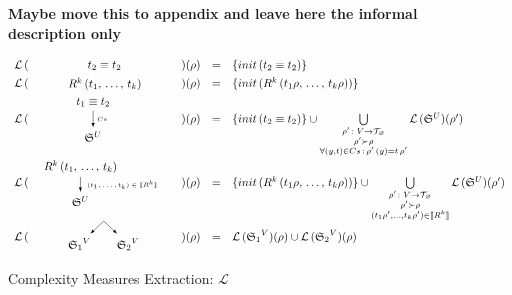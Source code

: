 \begin{figure}[t]
\colorbox{yellow!20}{\parbox{\textwidth}{\textbf{Maybe move this to appendix and leave here the informal description only}}}

\[
\begin{array}{rclcl}
 \mathcal{L}\,(&\parbox[m]{1.3cm}{\schemenode{$\unigoal{t_2}{t_2}$}}&)(\rho) &=& \{init\,(\unigoal{t_2}{t_2})\} \\

 \mathcal{L}\,(&\parbox[m]{2.5cm}{\schemenode{$\invokegoal{R^k}{t_1}{t_k}$}}&)(\rho) &=& \{init\,(\invokegoal{R^k}{t_1 \rho}{t_k \rho})\} \\

 \mathcal{L}\,(&\parbox[m]{2cm}{\schemesarrow{$\unigoal{t_1}{t_2}$}{$Cs$}{$\schemewithvset{\mathfrak{S}}{U}$}} &)(\rho) &=&  \{init\,(\unigoal{t_2}{t_2})\} \cup
      \bigcup\limits_{\substack{ \rho' \colon V \to \grterms \\
                                      \rho' \succ \rho \\
                                      \forall (y, t) \in Cs\,:\, \rho'\,(y) = t\, \rho'  }}
           \mathcal{L}\,(\schemewithvset{\mathfrak{S}}{U})(\rho')  \\

 \mathcal{L}\,(& \parbox[m]{4cm}{\schemedarrow{$\invokegoal{R^k}{t_1}{t_k}$}{ $(t_1, \dots, t_k) \in \sembr{R^k}  $}{$\schemewithvset{\mathfrak{S}}{U}$}} &)(\rho) &=&
      \{init\,(\invokegoal{R^k}{t_1 \rho}{t_k \rho})\} \cup
      \bigcup\limits_{\substack{ \rho' \colon V \to \grterms \\
                                      \rho' \succ \rho \\
                                      (t_1 \rho', \dots, t_k \rho') \in \sembr{R^k}  }}
           \mathcal{L}\,(\schemewithvset{\mathfrak{S}}{U})(\rho')  \\

 \mathcal{L}\,(&\parbox[m]{2.5cm}{\schemefork{$\schemewithvset{\mathfrak{S}_1}{V}$}{$\schemewithvset{\mathfrak{S}_2}{V}$}}&)(\rho) &=&
 \mathcal{L}\,(\schemewithvset{\mathfrak{S}_1}{V})(\rho) \cup \mathcal{L}\,(\schemewithvset{\mathfrak{S}_2}{V})(\rho)
\end{array}
\]
\caption{Complexity Measures Extraction: $\mathcal L$}
\label{fig:scheduling_extraction_l}
\end{figure}

